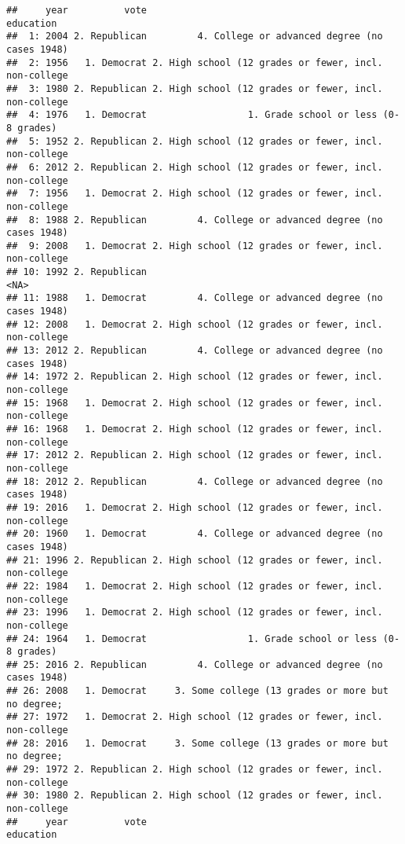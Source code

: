 \documentclass[
]{article}
\begin{document}
\begin{verbatim}
##     year          vote                                             education
##  1: 2004 2. Republican         4. College or advanced degree (no cases 1948)
##  2: 1956   1. Democrat 2. High school (12 grades or fewer, incl. non-college
##  3: 1980 2. Republican 2. High school (12 grades or fewer, incl. non-college
##  4: 1976   1. Democrat                  1. Grade school or less (0-8 grades)
##  5: 1952 2. Republican 2. High school (12 grades or fewer, incl. non-college
##  6: 2012 2. Republican 2. High school (12 grades or fewer, incl. non-college
##  7: 1956   1. Democrat 2. High school (12 grades or fewer, incl. non-college
##  8: 1988 2. Republican         4. College or advanced degree (no cases 1948)
##  9: 2008   1. Democrat 2. High school (12 grades or fewer, incl. non-college
## 10: 1992 2. Republican                                                  <NA>
## 11: 1988   1. Democrat         4. College or advanced degree (no cases 1948)
## 12: 2008   1. Democrat 2. High school (12 grades or fewer, incl. non-college
## 13: 2012 2. Republican         4. College or advanced degree (no cases 1948)
## 14: 1972 2. Republican 2. High school (12 grades or fewer, incl. non-college
## 15: 1968   1. Democrat 2. High school (12 grades or fewer, incl. non-college
## 16: 1968   1. Democrat 2. High school (12 grades or fewer, incl. non-college
## 17: 2012 2. Republican 2. High school (12 grades or fewer, incl. non-college
## 18: 2012 2. Republican         4. College or advanced degree (no cases 1948)
## 19: 2016   1. Democrat 2. High school (12 grades or fewer, incl. non-college
## 20: 1960   1. Democrat         4. College or advanced degree (no cases 1948)
## 21: 1996 2. Republican 2. High school (12 grades or fewer, incl. non-college
## 22: 1984   1. Democrat 2. High school (12 grades or fewer, incl. non-college
## 23: 1996   1. Democrat 2. High school (12 grades or fewer, incl. non-college
## 24: 1964   1. Democrat                  1. Grade school or less (0-8 grades)
## 25: 2016 2. Republican         4. College or advanced degree (no cases 1948)
## 26: 2008   1. Democrat     3. Some college (13 grades or more but no degree;
## 27: 1972   1. Democrat 2. High school (12 grades or fewer, incl. non-college
## 28: 2016   1. Democrat     3. Some college (13 grades or more but no degree;
## 29: 1972 2. Republican 2. High school (12 grades or fewer, incl. non-college
## 30: 1980 2. Republican 2. High school (12 grades or fewer, incl. non-college
##     year          vote                                             education

\end{verbatim}
\end{document}
